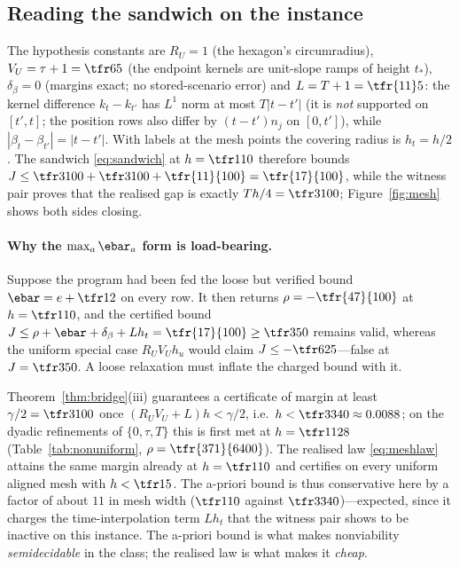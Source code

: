 \subsection{Reading the sandwich on the instance}\label{sec:sandwich}

The hypothesis constants are $R_U=1$ (the hexagon's circumradius), $V_U=\tau+1=\tfr65$ (the endpoint kernels are unit-slope ramps of height $t_\ast$), $\delta_\beta=0$ (margins exact; no stored-scenario error) and $L=T+1=\tfr{11}5$: the kernel difference $k_t-k_{t'}$ has $L^1$ norm at most $T|t-t'|$ (it is \emph{not} supported on $[t',t]$; the position rows also differ by $(t-t')n_j$ on $[0,t']$), while $|\beta_t-\beta_{t'}|=|t-t'|$. With labels at the mesh points the covering radius is $h_t=h/2$. The sandwich \eqref{eq:sandwich} at $h=\tfr1{10}$ therefore bounds $J\le\tfr3{100}+\tfr3{100}+\tfr{11}{100}=\tfr{17}{100}$, while the witness pair proves that the realised gap is exactly $Th/4=\tfr3{100}$; Figure~\ref{fig:mesh} shows both sides closing.

\paragraph{Why the $\max_a\ebar_a$ form is load-bearing.}
Suppose the program had been fed the loose but verified bound $\ebar=e+\tfr12$ on every row. It then returns $\rho=-\tfr{47}{100}$ at $h=\tfr1{10}$, and the certified bound $J\le\rho+\ebar+\delta_\beta+Lh_t=\tfr{17}{100}\ge\tfr3{50}$ remains valid, whereas the uniform special case $R_UV_Uh_u$ would claim $J\le-\tfr6{25}$---false at $J=\tfr3{50}$. A loose relaxation must inflate the charged bound with it.

\begin{remark}\label{rem:apriori}
Theorem~\ref{thm:bridge}(iii) guarantees a certificate of margin at least $\gamma/2=\tfr3{100}$ once $(R_UV_U+L)h<\gamma/2$, i.e.\ $h<\tfr3{340}\approx0.0088$; on the dyadic refinements of $\{0,\tau,T\}$ this is first met at $h=\tfr1{128}$ (Table~\ref{tab:nonuniform}, $\rho=\tfr{371}{6400}$). The realised law \eqref{eq:meshlaw} attains the same margin already at $h=\tfr1{10}$ and certifies on every uniform aligned mesh with $h<\tfr15$. The a-priori bound is thus conservative here by a factor of about $11$ in mesh width ($\tfr1{10}$ against $\tfr3{340}$)---expected, since it charges the time-interpolation term $Lh_t$ that the witness pair shows to be inactive on this instance. The a-priori bound is what makes nonviability \emph{semidecidable} in the class; the realised law is what makes it \emph{cheap}.
\end{remark}

